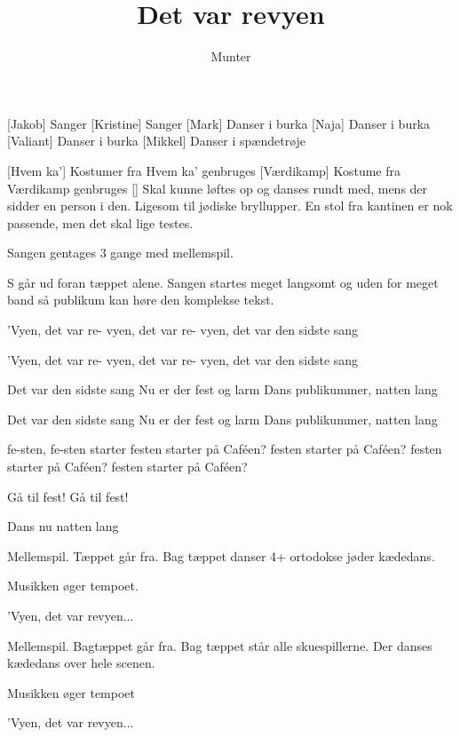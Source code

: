 \documentclass[a4paper,11pt]{article}
\title{Det var revyen}
\author{Munter}
\begin{document}
\maketitle

\begin{roles}  
[Jakob] Sanger
[Kristine] Sanger
[Mark] Danser i burka
[Naja] Danser i burka
[Valiant] Danser i burka
[Mikkel] Danser i spændetrøje
\end{roles}

\begin{props}
[Hvem ka'] Kostumer fra Hvem ka' genbruges
[Værdikamp] Kostume fra Værdikamp genbruges
[] Skal kunne løftes op og danses rundt med, mens der sidder en person i den. Ligesom til jødiske bryllupper. En stol fra kantinen er nok passende, men det skal lige testes.

\end{props}

\scene Sangen gentages 3 gange med mellemspil.

\scene S går ud foran tæppet alene. Sangen startes meget langsomt og uden for meget band så publikum kan høre den komplekse tekst.

\begin{song}
   'Vyen, det var re-
vyen, det var re-
vyen, det var den sidste sang

'Vyen, det var re-
vyen, det var re-
vyen, det var den sidste sang

Det var den sidste sang
Nu er der fest og larm
Dans publikummer, natten lang

Det var den sidste sang
Nu er der fest og larm
Dans publikummer, natten lang

fe-sten, fe-sten starter
festen starter på Caféen?
festen starter på Caféen?
festen starter på Caféen?
festen starter på Caféen?

Gå til fest!
Gå til fest!

Dans nu natten lang

\scene Mellemspil. Tæppet går fra. Bag tæppet danser 4+ ortodokse jøder kædedans.

\scene Musikken øger tempoet.

 'Vyen, det var revyen...

\scene Mellemspil. Bagtæppet går fra. Bag tæppet står alle skuespillerne. Der danses kædedans over hele scenen.

\scene Musikken øger tempoet

 'Vyen, det var revyen...

\end{song}
\end{document}
